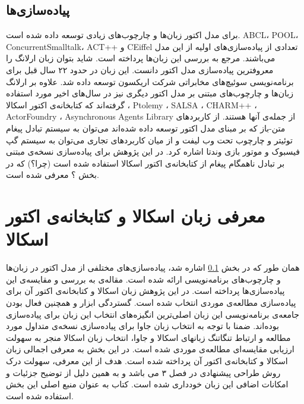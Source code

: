 \subsection{پیاده‌سازی‌ها}
\label{subsection:actorImpls}
برای مدل اکتور زبان‌ها و چارچوب‌های زیادی توسعه داده شده است. ABCL، POOL، ConcurrentSmalltalk، ACT++ و CEiffel تعدادی از پیاده‌سازی‌های اولیه از این مدل می‌باشند. مرجع \cite{Briot98concurrencyand} به بررسی این زبان‌ها پرداخته است. شاید بتوان زبان  \gls{ارلانگ}\cite{erlang} را معروفترین پیاده‌سازی مدل اکتور دانست. این زبان در حدود ۲۲ سال قبل برای برنامه‌نویسی سوئیچ‌های مخابراتی شرکت اریکسون توسعه داده شد. علاوه بر ارلانگ زبان‌ها و چارچوب‌های مبتنی بر مدل اکتور دیگری نیز در سال‌های اخیر مورد استفاده گرفته‌اند که کتابخانه‌ی اکتور اسکالا
 \cite{ScalaActors}،  Ptolemy \cite{Ptolemy}، SALSA \cite{salsa}، CHARM++ \cite{CHARMplus}، ActorFoundry \cite{ActorFoundry}، Asynchronous Agents Library \cite{AsyncAgentsLib}  از جمله‌ی آنها هستند.
  از کاربردهای متن-باز که بر مبنای مدل اکتور توسعه داده شده‌اند می‌توان به سیستم تبادل پیغام توئیتر و چارچوب تحت وب لیفت و از میان کاربرد‌های تجاری می‌توان به سیستم گپ فیسبوک و موتور بازی وندتا اشاره کرد.
در این پژوهش برای پیاده‌سازی نسخه‌ی مبتنی بر تبادل ناهمگام پیغام از کتابخانه‌ی اکتور اسکالا استفاده شده است (چرا؟) که در بخش ؟ معرفی شده است.


\section{معرفی زبان اسکالا و کتابخانه‌ی اکتور اسکالا}
\label{section:Scala}
همان طور که در بخش \ref{subsection:actorImpls} اشاره شد، پیاده‌سازی‌های مختلفی از مدل اکتور در زبان‌ها و چارچوب‌های برنامه‌نویسی ارائه شده است. مقاله‌ی \cite{ActorsJVM2009} به بررسی و مقایسه‌ی این پیاده‌سازی‌ها پرداخته است. در این پژوهش زبان اسکالا و کتابخانه‌ی اکتور آن برای پیاده‌سازی مطالعه‌ی موردی انتخاب شده است. گستردگی ابزار و همچنین فعال بودن جامعه‌ی برنامه‌نویسی این زبان اصلی‌ترین انگیزه‌های انتخاب این زبان برای پیاده‌سازی بوده‌اند. ضمنا با توجه به انتخاب زبان جاوا برای پیاده‌سازی نسخه‌ی متداول مورد مطالعه و ارتباط تنگاتنگ زبانهای اسکالا و جاوا، انتخاب زبان اسکالا منجر به سهولت ارزیابی مقایسه‌ای مطالعه‌ی موردی شده است. در این بخش به معرفی اجمالی زبان اسکالا و کتابخانه‌ی اکتور آن پرداخته شده است. هدف از این معرفی، سهولت درک روش طراحی پیشنهادی در فصل ۳ می باشد و به همین دلیل از توضیح جزئیات و امکانات اضافی این زبان خودداری شده است. کتاب \cite{programmingInScala} به عنوان منبع اصلی این بخش استفاده شده است.
